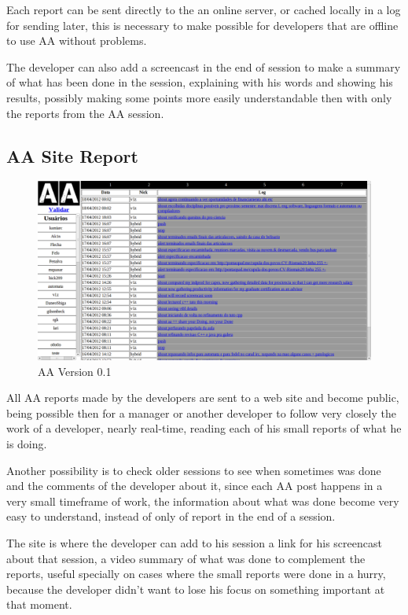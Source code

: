 \documentclass[letterpaper]{article}
\begin{document}
Each report can be sent directly to the an online server, or cached locally in
a log for sending later, this is necessary to make possible for developers that are
offline to use AA without problems.

The developer can also add a screencast in the end of session to make a summary
of what has been done in the session, explaining with his words and showing his
results, possibly making some points more easily understandable then with only
the reports from the AA session.

\subsection{AA Site Report}

\begin{figure}
\begin{center}
   \includegraphics[width=0.8\linewidth,keepaspectratio=true]{figs/aa-0_1.png}
\end{center}
   \caption{
   AA Version 0.1
   }
\label{fig:aaserver}
\end{figure}

All AA reports made by the developers are sent to a web site and become public,
being possible then for a manager or another developer to follow very closely
the work of a developer, nearly real-time, reading each of his small reports of
what he is doing.

Another possibility is to check older sessions to see when sometimes was done
and the comments of the developer about it, since each AA post happens in a
very small timeframe of work, the information about what was done become very
easy to understand, instead of only of report in the end of a session.

The site is where the developer can add to his session a link for his
screencast about that session, a video summary of what was done to complement
the reports, useful specially on cases where the small reports were done in a
hurry, because the developer didn't want to lose his focus on something
important at that moment.
\end{document}
